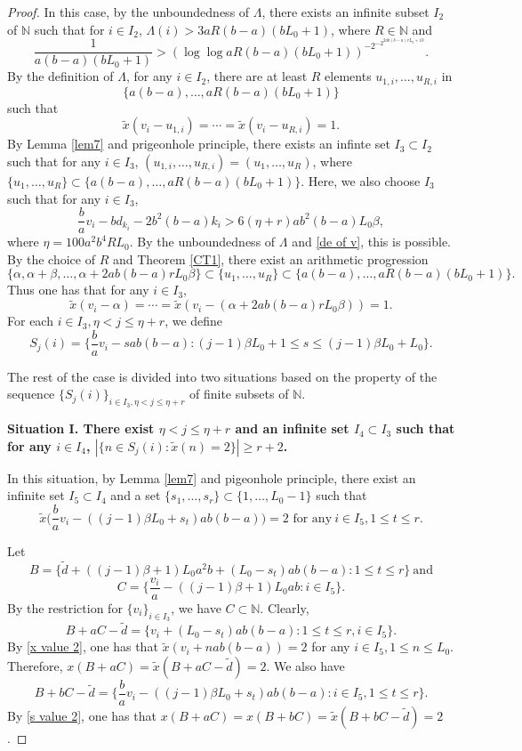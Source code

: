 \documentclass[reqno,12pt]{amsart}
\def \N {\mathbb N}
\numberwithin{equation}{section}
\begin{document}
\begin{proof}
	 In this case, by the unboundedness of $\Lambda$,  there exists an infinite subset $I_2$ of $\N$ such that for $i\in I_2$, $\Lambda(i)>3aR(b-a)(bL_0+1)$, where $R\in \N$ and  $$\frac{1}{a(b-a)(bL_0+1)}> (\log \log aR(b-a)(bL_0+1))^{-2^{-2^{2ab(b-a)rL_0+10}}}.$$
By the definition of $\Lambda$, for any $i\in I_2$, there are at least $R$ elements $u_{1,i},\ldots,u_{R,i}$ in $$\{a(b-a),\ldots,aR(b-a)(bL_0+1)\}$$ such that
$$\tilde{x}(v_{i}-u_{1,i})=\cdots=\tilde{x}(v_{i}-u_{R,i})=1.$$	
By Lemma \ref{lem7} and prigeonhole principle, there exists an infinte set $I_3\subset I_2$ such that for any $i\in I_3$, $(u_{1,i},\ldots,u_{R,i})=(u_1,\ldots,u_R)$, where $\{u_1,\ldots,u_R\}\subset \{a(b-a),\ldots,aR(b-a)(bL_0+1)\}$. Here, we also choose $I_3$ such that for any $i\in I_3$, $$\frac{b}{a}v_{i}-bd_{k_i}-2b^{2}(b-a){k_i}>6(\eta+r)ab^{2}(b-a)L_0\beta,$$ where  $\eta=100a^2b^4RL_0$.	By the unboundedness of $\Lambda$ and \eqref{de of v}, this is possible. By the choice of $R$ and Theorem \ref{CT1}, there exist an arithmetic progression
$$\{\alpha,\alpha+\beta,\ldots,\alpha+2ab(b-a)rL_0\beta\}\subset \{u_1,\ldots,u_R\}\subset\{a(b-a),\ldots,aR(b-a)(bL_0+1)\}.$$
Thus one has that for any $i\in I_3$,
\begin{equation}\label{alpha value 1}\tilde{x}(v_{i}-\alpha)=\cdots=\tilde{x}(v_{i}-(\alpha+2ab(b-a)rL_0\beta))=1.
\end{equation}
	For each $i\in I_3,\eta< j\le \eta+r$, we define
\begin{equation}\label{de of Sj}
S_j(i)=\{\frac{b}{a}v_{i}-sab(b-a):(j-1)\beta L_0+1\leq s\leq (j-1)\beta L_0+L_0\}.
\end{equation}
	
	The rest of the case is divided into two situations based on the property of the sequence $\{S_{j}(i)\}_{i\in I_3,\eta<j\le \eta+r}$ of finite subsets of $\N$.
	
	\noindent\textbf{Situation I. There exist $\eta< j\le \eta+r$ and an infinite set $I_4\subset I_3$ such that for any $i\in I_4$, $|\{n\in S_j(i):\tilde{x}(n)=2\}|\ge r+2$.}

In this situation, by Lemma \ref{lem7} and pigeonhole principle, there exist an infinite set $I_5\subset I_4$ and a set $\{s_1,\ldots,s_{r}\}\subset\{1,\ldots,L_0-1\}$ such that
\begin{equation}\label{s value 2}\tilde{x}\big(\frac{b}{a}v_i-((j-1)\beta L_0+s_t)ab(b-a)\big)=2\text{ for any}\ i\in I_5,1\leq t\leq r.
\end{equation}

Let	$$B=\{\tilde{d}+((j-1)\beta +1)L_{0}a^{2}b+(L_{0}-s_{t})ab(b-a):1\le t\le r\}\ \text{and}$$ $$C=\Big\{\frac{v_{i}}{a}-((j-1)\beta +1)L_{0}ab:i\in I_5\Big\}.$$
By the restriction for $\{v_i\}_{i\in I_3}$, we have $C\subset \N$. Clearly,
$$B+aC-\tilde{d}=\{v_i+(L_{0}-s_{t})ab(b-a):1\leq t\leq r,i\in I_5\}.$$
By \eqref{x value 2}, one has that $\tilde{x}(v_i+nab(b-a))=2 $ for any $i\in I_5,1\leq n\leq L_0$. Therefore, $x(B+aC)=\tilde{x}(B+aC-\tilde{d})=2$. We also have
$$B+bC-\tilde{d}=\{\frac{b}{a}v_i-((j-1)\beta L_0+s_t)ab(b-a):i\in I_5,1\leq t\leq r\}.$$
By \eqref{s value 2}, one has that $x(B+aC)=x(B+bC)=\tilde{x}(B+bC-\tilde{d})=2$.
	

\end{proof}
\end{document}
